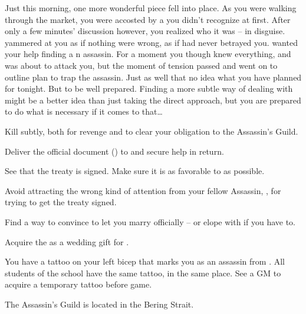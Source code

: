 \documentclass[char]{NeptuneBall}
\begin{document}
Just this morning, one more wonderful piece fell into place. As you were walking through the market, you were accosted by a \cQueen{\mer} you didn't recognize at first. After only a few minutes' discussion however, you realized who it was -- \cQueen{} in disguise. \cQueen{\They} yammered at you as if nothing were wrong, as if \cQueen{\they} had never betrayed you. \cQueen{} wanted your help finding a \pPacifica{}n assassin. For a moment you though \cQueen{\they} knew everything, and was about to attack you, but the moment of tension passed and \cQueen{\they} went on to outline \cQueen{\their} plan to trap the assassin. Just as well that \cQueen{\they} \cQueen{\have} no idea what you have planned for \cQueen{\them} tonight. But \cQueen{\they} \cQueen{\seem} to be well prepared. Finding a more subtle way of dealing with \cQueen{\them} might be a better idea than just taking the direct approach, but you are prepared to do what is necessary if it comes to that\ldots

\begin{itemz}[Goals]
  \item Kill \cQueen{} subtly, both for revenge and to clear your obligation to the Assassin's Guild.
	\item Deliver the official document (\iBirthCertificate{\MYnumber}) to \cManta{} and secure \cManta{\their} help in return.
  \item See that the treaty is signed. Make sure it is as favorable to \pPacifica{} as possible.
	\item Avoid attracting the wrong kind of attention from your fellow Assassin, \cSpy{}, for trying to get the treaty signed.
  \item Find a way to convince \cKing{} to let you marry \cPrincess{} officially -- or elope with \cPrincess{} if you have to.
  \item Acquire the \iGlowShell{} as a wedding gift for \cPrincess{}.
\end{itemz}

\begin{itemz}[Notes]
  \item You have a tattoo on your left bicep that marks you as an assassin from \pAssassin{}. All students of the school have the same tattoo, in the same place. See a GM to acquire a temporary tattoo before game.
\end{itemz}

\begin{itemz}[Trivia]
  \item The Assassin's Guild is located in the Bering Strait.
\end{itemz}
\end{document}
